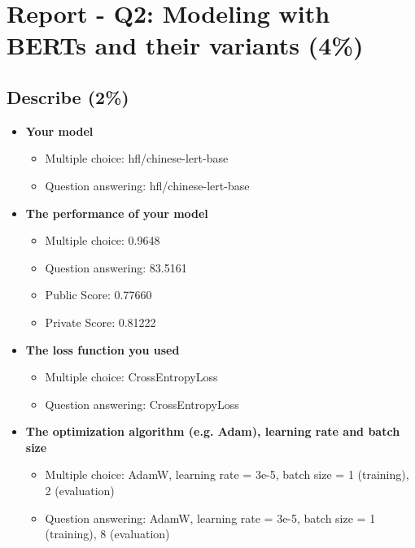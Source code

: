 \documentclass{article}
\begin{document}
\section{Report - Q2: Modeling with BERTs and their variants (4\%)}

\subsection{Describe (2\%)}
\begin{itemize}
    \item \textbf{Your model}
          \begin{itemize}
              \item Multiple choice: hfl/chinese-lert-base
              \item Question answering: hfl/chinese-lert-base
          \end{itemize}
    \item \textbf{The performance of your model}
          \begin{itemize}
              \item Multiple choice: 0.9648
              \item Question answering: 83.5161
              \item Public Score: 0.77660
              \item Private Score: 0.81222
          \end{itemize}
    \item \textbf{The loss function you used}
          \begin{itemize}
              \item Multiple choice: CrossEntropyLoss
              \item Question answering: CrossEntropyLoss
          \end{itemize}
    \item \textbf{The optimization algorithm (e.g. Adam), learning rate and batch size}
          \begin{itemize}
              \item Multiple choice: AdamW, learning rate = 3e-5, batch size = 1 (training), 2 (evaluation)
              \item Question answering: AdamW, learning rate = 3e-5, batch size = 1 (training), 8 (evaluation)
          \end{itemize}
\end{itemize}
\end{document}
